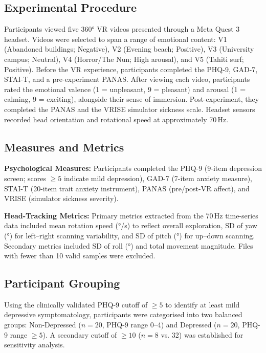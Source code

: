 \documentclass[12pt]{article}
\begin{document}
\subsection{Experimental Procedure}
Participants viewed five 360° VR videos presented through a Meta Quest 3 headset. Videos were selected to span a range of emotional content: V1 (Abandoned buildings; Negative), V2 (Evening beach; Positive), V3 (University campus; Neutral), V4 (Horror/The Nun; High arousal), and V5 (Tahiti surf; Positive). Before the VR experience, participants completed the PHQ-9, GAD-7, STAI-T, and a pre-experiment PANAS. After viewing each video, participants rated the emotional valence (1 = unpleasant, 9 = pleasant) and arousal (1 = calming, 9 = exciting), alongside their sense of immersion. Post-experiment, they completed the PANAS and the VRISE simulator sickness scale. Headset sensors recorded head orientation and rotational speed at approximately 70\,Hz.

\subsection{Measures and Metrics}
\textbf{Psychological Measures:} Participants completed the PHQ-9 (9-item depression screen; scores $\geq 5$ indicate mild depression), GAD-7 (7-item anxiety measure), STAI-T (20-item trait anxiety instrument), PANAS (pre/post-VR affect), and VRISE (simulator sickness severity). 

\textbf{Head-Tracking Metrics:} Primary metrics extracted from the 70\,Hz time-series data included mean rotation speed (°/s) to reflect overall exploration, SD of yaw (°) for left--right scanning variability, and SD of pitch (°) for up--down scanning. Secondary metrics included SD of roll (°) and total movement magnitude. Files with fewer than 10 valid samples were excluded.

\subsection{Participant Grouping}
Using the clinically validated PHQ-9 cutoff of $\geq 5$ to identify at least mild depressive symptomatology, participants were categorised into two balanced groups: Non-Depressed ($n=20$, PHQ-9 range 0--4) and Depressed ($n=20$, PHQ-9 range $\geq 5$). A secondary cutoff of $\geq 10$ ($n=8$ vs. 32) was established for sensitivity analysis.
\end{document}
